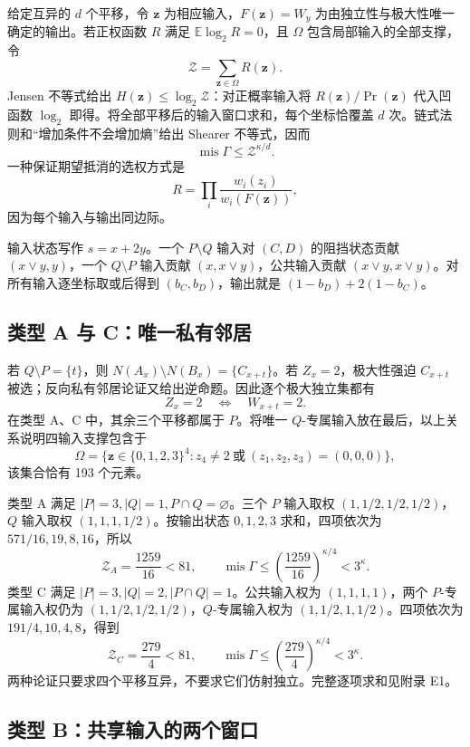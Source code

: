 \documentclass[11pt]{ctexart}
\begin{document}
给定互异的 \(d\) 个平移，令 \(\boldsymbol z\) 为相应输入，\(F(\boldsymbol z)=W_y\) 为由独立性与极大性唯一确定的输出。若正权函数 \(R\) 满足 \(\mathbb E\log_2 R=0\)，且 \(\Omega\) 包含局部输入的全部支撑，令
\[
 \mathcal Z=\sum_{\boldsymbol z\in\Omega}R(\boldsymbol z).
\]
Jensen 不等式给出 \(H(\boldsymbol z)\le\log_2\mathcal Z\)：对正概率输入将 \(R(\boldsymbol z)/\Pr(\boldsymbol z)\) 代入凹函数 \(\log_2\) 即得。将全部平移后的输入窗口求和，每个坐标恰覆盖 \(d\) 次。链式法则和“增加条件不会增加熵”给出 Shearer 不等式，因而
\[
 \operatorname{mis}\Gamma\le\mathcal Z^{\kappa/d}.
\]
一种保证期望抵消的选权方式是
\[
 R=\prod_i\frac{w_i(z_i)}{w_i(F(\boldsymbol z))},
\]
因为每个输入与输出同边际。

输入状态写作 \(s=x+2y\)。一个 \(P\setminus Q\) 输入对 \((C,D)\) 的阻挡状态贡献 \((x\vee y,y)\)，一个 \(Q\setminus P\) 输入贡献 \((x,x\vee y)\)，公共输入贡献 \((x\vee y,x\vee y)\)。对所有输入逐坐标取或后得到 \((b_C,b_D)\)，输出就是 \((1-b_D)+2(1-b_C)\)。

\subsection{类型 A 与 C：唯一私有邻居}

若 \(Q\setminus P=\{t\}\)，则 \(N(A_x)\setminus N(B_x)=\{C_{x+t}\}\)。若 \(Z_x=2\)，极大性强迫 \(C_{x+t}\) 被选；反向私有邻居论证又给出逆命题。因此逐个极大独立集都有
\[
 Z_x=2\quad\Longleftrightarrow\quad W_{x+t}=2.
\]
在类型 A、C 中，其余三个平移都属于 \(P\)。将唯一 \(Q\)-专属输入放在最后，以上关系说明四输入支撑包含于
\[
 \Omega=\{\boldsymbol z\in\{0,1,2,3\}^4:
 z_4\ne2\ \text{或}\ (z_1,z_2,z_3)=(0,0,0)\},
\]
该集合恰有 193 个元素。

类型 A 满足 \(|P|=3,|Q|=1,P\cap Q=\varnothing\)。三个 \(P\) 输入取权 \((1,1/2,1/2,1/2)\)，\(Q\) 输入取权 \((1,1,1,1/2)\)。按输出状态 \(0,1,2,3\) 求和，四项依次为 \(571/16,19,8,16\)，所以
\[
 \mathcal Z_A=\frac{1259}{16}<81,
 \qquad\operatorname{mis}\Gamma\le
 \left(\frac{1259}{16}\right)^{\kappa/4}<3^\kappa.
\]
类型 C 满足 \(|P|=3,|Q|=2,|P\cap Q|=1\)。公共输入权为 \((1,1,1,1)\)，两个 \(P\)-专属输入权仍为 \((1,1/2,1/2,1/2)\)，\(Q\)-专属输入权为 \((1,1/2,1,1/2)\)。四项依次为 \(191/4,10,4,8\)，得到
\[
 \mathcal Z_C=\frac{279}{4}<81,
 \qquad\operatorname{mis}\Gamma\le
 \left(\frac{279}{4}\right)^{\kappa/4}<3^\kappa.
\]
两种论证只要求四个平移互异，不要求它们仿射独立。完整逐项求和见附录 E1。

\subsection{类型 B：共享输入的两个窗口}
\end{document}
